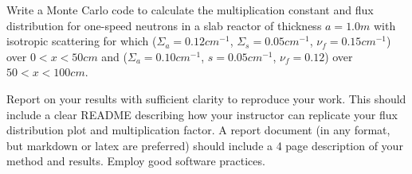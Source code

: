 \documentclass[12pts]{exam}
\begin{document}
\begin{questions}
        \question[30] Write a Monte Carlo code to calculate the multiplication
constant and flux distribution for one-speed neutrons in a
slab reactor of thickness $a = 1.0 m$ with isotropic scattering
for which ($\Sigma_a = 0.12 cm^{−1}$, $\Sigma_s = 0.05 cm^{−1}$,
$\nu_f= 0.15 cm^{−1}$) over $0 <x< 50 cm$ and ($\Sigma_a = 0.10 cm^{−1}$,
$s = 0.05 cm^{−1}$, $\nu_f = 0.12$) over $50 <x< 100 cm$.

        \question[30] Report on your results with sufficient clarity to reproduce 
        your work. This should include a clear README describing how your 
        instructor can replicate your flux distribution plot and multiplication 
        factor. A report document (in any format, but markdown or latex are 
        preferred) should include a 4 page description of your method and 
        results.
	\question Employ good software practices.

\end{questions}



%
%
\end{document}
